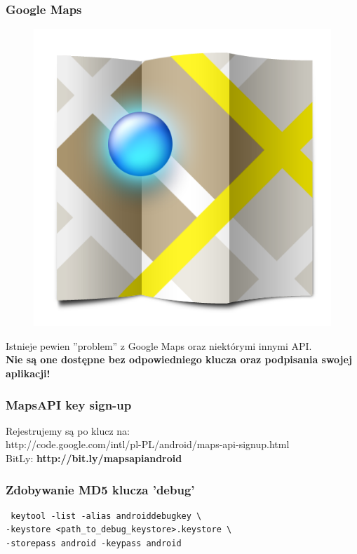 \begin{frame}\frametitle{Google Maps}

\begin{figure}[tc]
  \centering
  \includegraphics[height=0.45\textheight,keepaspectratio=true]{images/maps_icon}
\end{figure}

Istnieje pewien ''problem'' z Google Maps oraz niektórymi innymi API. \\
\textbf{Nie są one dostępne bez odpowiedniego klucza oraz podpisania swojej aplikacji!}
\end{frame}


\begin{frame}\frametitle{MapsAPI key sign-up}
\begin{center}
  Rejestrujemy są po klucz na: \\
  http://code.google.com/intl/pl-PL/android/maps-api-signup.html \\
  BitLy: \textbf{http://bit.ly/mapsapiandroid}
\end{center}
\end{frame}


\begin{frame}[fragile]\frametitle{Zdobywanie MD5 klucza 'debug'}
\begin{lstlisting}
 keytool -list -alias androiddebugkey \
-keystore <path_to_debug_keystore>.keystore \
-storepass android -keypass android
\end{lstlisting}
\end{frame}


